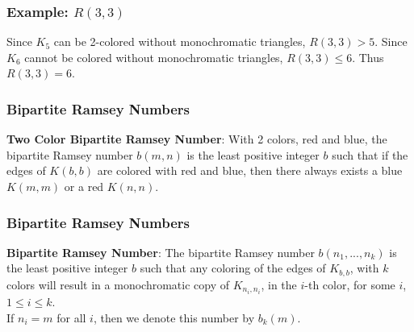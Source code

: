 \documentclass[pdf,hyperref={urlbordercolor={0 1 1}},xcolor=pdftex,dvipsnames]{beamer}
\begin{document}
\begin{frame}
  \frametitle{Example: $R(3,3)$}
  \begin{center}
    \begin{minipage}[b]{.47\textwidth}
      
    \end{minipage}
    \begin{minipage}[b]{.47\textwidth}
      
    \end{minipage}
  \end{center}
  Since $K_5$ can be 2-colored without monochromatic triangles, $R(3,3)> 5$.
    Since $K_6$ cannot be colored without monochromatic triangles, $R(3,3)\le6$.
    Thus $R(3,3)=6$.
\end{frame}

\begin{frame}
  \frametitle{Bipartite Ramsey Numbers}
  \textbf{Two Color Bipartite Ramsey Number}: With 2 colors, red and blue, the bipartite 
    Ramsey number $b(m,n)$ is the least positive integer $b$ such that if the edges of $K(b,b)$ 
    are colored with red and blue, then there always exists a blue $K(m,m)$ or a red $K(n,n)$.\\
  \begin{minipage}[b]{.47\textwidth}
    
  \end{minipage}
  \begin{minipage}[b]{.47\textwidth}
    
  \end{minipage}
\end{frame}

\begin{frame}[noframenumbering]
  \frametitle{Bipartite Ramsey Numbers}
  \textbf{Bipartite Ramsey Number}: The bipartite Ramsey number $b(n_1,...,n_k)$ is the 
    least positive integer $b$ such that any coloring of the edges of $K_{b,b}$, with $k$ colors 
    will result in a monochromatic copy of $K_{n_i,n_i}$, in the $i$-th color, for some $i$, $1\le 
    i \le k$.\\\vspace{.25cm} 
  If $n_i = m$ for all $i$, then we denote this number by $b_k(m)$.
\end{frame}
\end{document}
